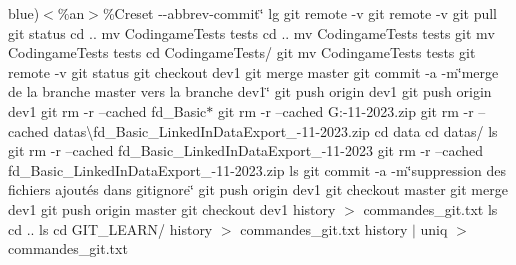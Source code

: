 blue)$<$\%an$>$\%\+Creset\textquotesingle{} -\/-\/abbrev-\/commit\char`\"{} lg git remote -\/v git remote -\/v git pull git status cd .. mv Codingame\+Tests tests cd .. mv Codingame\+Tests tests git mv Codingame\+Tests tests cd Codingame\+Tests/ git mv Codingame\+Tests tests git remote -\/v git status git checkout dev1 git merge master git commit -\/a -\/m\char`\"{}merge de la branche master vers la branche dev1\char`\"{} git push origin dev1 git push origin dev1 git rm -\/r --cached fd\+\_\+\+Basic$\ast$ git rm -\/r --cached G\+:-\/11-\/2023.\+zip git rm -\/r --cached datas\textbackslash{}fd\+\_\+\+Basic\+\_\+\+Linked\+In\+Data\+Export\+\_-\/11-\/2023.\+zip cd data cd datas/ ls git rm -\/r --cached fd\+\_\+\+Basic\+\_\+\+Linked\+In\+Data\+Export\+\_-\/11-\/2023 git rm -\/r --cached fd\+\_\+\+Basic\+\_\+\+Linked\+In\+Data\+Export\+\_-\/11-\/2023.\+zip ls git commit -\/a -\/m\char`\"{}suppression des fichiers ajoutés dans gitignore\char`\"{} git push origin dev1 git checkout master git merge dev1 git push origin master git checkout dev1 history $>$ commandes\+\_\+git.\+txt ls cd .. ls cd G\+I\+T\+\_\+\+L\+E\+A\+R\+N/ history $>$ commandes\+\_\+git.\+txt history $\vert$ uniq $>$ commandes\+\_\+git.\+txt 